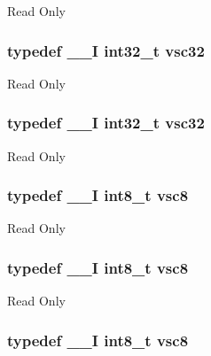 Read Only \hypertarget{group___exported__types_gaec1d22666cf030b79051e5daa372fbc8}{
\subsubsection[{vsc32}]{\setlength{\rightskip}{0pt plus 5cm}typedef {\bf \-\_\-\-\_\-\-I} int32\-\_\-t {\bf vsc32}}}\label{group___exported__types_gaec1d22666cf030b79051e5daa372fbc8}
Read Only \hypertarget{group___exported__types_gaec1d22666cf030b79051e5daa372fbc8}{
\subsubsection[{vsc32}]{\setlength{\rightskip}{0pt plus 5cm}typedef {\bf \-\_\-\-\_\-\-I} int32\-\_\-t {\bf vsc32}}}\label{group___exported__types_gaec1d22666cf030b79051e5daa372fbc8}
Read Only \hypertarget{group___exported__types_ga47463bcded079ac61d5da46aff497803}{
\subsubsection[{vsc8}]{\setlength{\rightskip}{0pt plus 5cm}typedef {\bf \-\_\-\-\_\-\-I} int8\-\_\-t {\bf vsc8}}}\label{group___exported__types_ga47463bcded079ac61d5da46aff497803}
Read Only \hypertarget{group___exported__types_ga47463bcded079ac61d5da46aff497803}{
\subsubsection[{vsc8}]{\setlength{\rightskip}{0pt plus 5cm}typedef {\bf \-\_\-\-\_\-\-I} int8\-\_\-t {\bf vsc8}}}\label{group___exported__types_ga47463bcded079ac61d5da46aff497803}
Read Only \hypertarget{group___exported__types_ga47463bcded079ac61d5da46aff497803}{
\subsubsection[{vsc8}]{\setlength{\rightskip}{0pt plus 5cm}typedef {\bf \-\_\-\-\_\-\-I} int8\-\_\-t {\bf vsc8}}}\label{group___exported__types_ga47463bcded079ac61d5da46aff497803}
